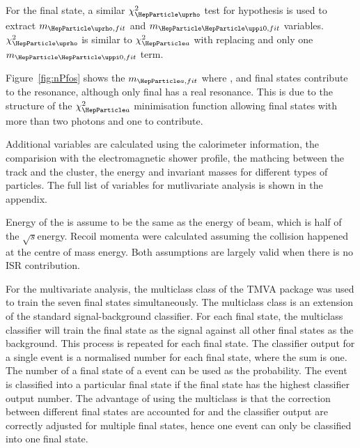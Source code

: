 \documentclass[a4paper,11pt]{article}
\newcommand{\decayRho}{\PGrP{\PGpm\PGpz}\PGnGt}
\newcommand{\decayAiPhoton}{\PaDoP{\PGpm\PGpz\PGpz}\PGnGt}
\newcommand{\decayThreePionPhoton}{\PGpm\PGpm\PGpp\PGnGt}
\newcommand{\rootS}{\ensuremath{\sqrt{s}}}
\begin{document}
For the \decayRho final state, a similar $\chi_{\PGr}^{2}$ test for \PGr hypothesis is used to extract $m_{\PGr,fit}$ and $m_{\PGpz,fit}$ variables. $\chi_{\PGr}^{2}$ is similar to $\chi_{\Pa}^{2}$ with \PGr replacing \Pa and only one $m_{\PGpz,fit}$ term.


Figure~\ref{fig:nPfos} shows the $m_{\Pa,fit}$ where \decayRho, \decayAiPhoton  and \decayThreePionPhoton final states contribute to the \Pa resonance, although only \decayAiPhoton final has a real \Pa resonance. This is due to the structure of the  $\chi_{\Pa}^{2}$ minimisation function allowing final states with more than two photons and one \PGppm to contribute.

Additional variables are calculated using the calorimeter information, the comparision with the electromagnetic shower profile, the mathcing between the track and the cluster, the energy and invariant masses for different types of particles. The full list of variables for mutlivariate analysis is shown in the appendix.




Energy of the \PGt is assume to be the same as the energy of \Pepm beam, which is half of the \rootS energy. Recoil momenta were calculated assuming the \Pem\Pep collision happened at the centre of mass energy. Both assumptions are largely valid when there is no ISR contribution. %

For the multivariate analysis, the multiclass class of the TMVA package \cite{Therhaag:2009dp} was used to train the seven final states simultaneously. The multiclass class is an extension of the standard signal-background classifier. For each final state, the multiclass classifier will train the final state as the signal against all other final states as the background. This process is repeated for each final state. The classifier output for a single event is a normalised number for each final state, where the sum is one. The number of a final state of a event can be used as the probability. The event is classified into a particular final state if the final state has the highest classifier output number. The advantage of using the multiclass is that the correction between different final states are accounted for and the classifier output are correctly adjusted for multiple final states, hence one event can only be classified into one final state.
\end{document}
